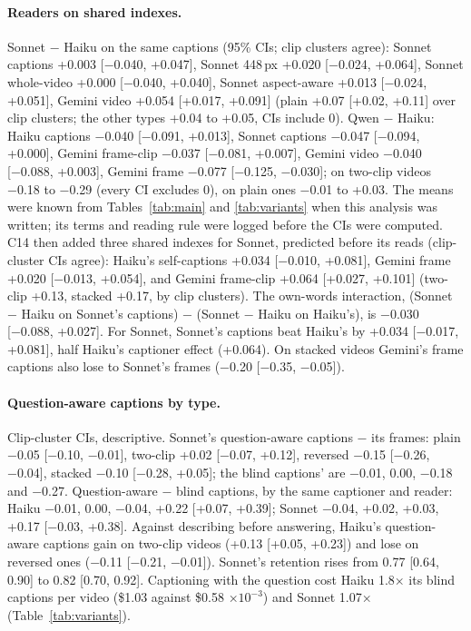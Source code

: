 \documentclass[11pt]{article}
\begin{document}
\paragraph{Readers on shared indexes.} Sonnet − Haiku on the same captions (95\% CIs; clip clusters agree): Sonnet captions +0.003 [−0.040, +0.047], Sonnet 448\,px +0.020 [−0.024, +0.064], Sonnet whole-video +0.000 [−0.040, +0.040], Sonnet aspect-aware +0.013 [−0.024, +0.051], Gemini video +0.054 [+0.017, +0.091] (plain +0.07 [+0.02, +0.11] over clip clusters; the other types +0.04 to +0.05, CIs include 0). Qwen − Haiku: Haiku captions −0.040 [−0.091, +0.013], Sonnet captions −0.047 [−0.094, +0.000], Gemini frame-clip −0.037 [−0.081, +0.007], Gemini video −0.040 [−0.088, +0.003], Gemini frame −0.077 [−0.125, −0.030]; on two-clip videos −0.18 to −0.29 (every CI excludes 0), on plain ones −0.01 to +0.03. The means were known from Tables~\ref{tab:main} and \ref{tab:variants} when this analysis was written; its terms and reading rule were logged before the CIs were computed. C14 then added three shared indexes for Sonnet, predicted before its reads (clip-cluster CIs agree): Haiku's self-captions +0.034 [−0.010, +0.081], Gemini frame +0.020 [−0.013, +0.054], and Gemini frame-clip +0.064 [+0.027, +0.101] (two-clip +0.13, stacked +0.17, by clip clusters). The own-words interaction, (Sonnet − Haiku on Sonnet's captions) − (Sonnet − Haiku on Haiku's), is −0.030 [−0.088, +0.027]. For Sonnet, Sonnet's captions beat Haiku's by +0.034 [−0.017, +0.081], half Haiku's captioner effect (+0.064). On stacked videos Gemini's frame captions also lose to Sonnet's frames (−0.20 [−0.35, −0.05]).

\paragraph{Question-aware captions by type.} Clip-cluster CIs, descriptive. Sonnet's question-aware captions − its frames: plain −0.05 [−0.10, −0.01], two-clip +0.02 [−0.07, +0.12], reversed −0.15 [−0.26, −0.04], stacked −0.10 [−0.28, +0.05]; the blind captions' are −0.01, 0.00, −0.18 and −0.27. Question-aware − blind captions, by the same captioner and reader: Haiku −0.01, 0.00, −0.04, +0.22 [+0.07, +0.39]; Sonnet −0.04, +0.02, +0.03, +0.17 [−0.03, +0.38]. Against describing before answering, Haiku's question-aware captions gain on two-clip videos (+0.13 [+0.05, +0.23]) and lose on reversed ones (−0.11 [−0.21, −0.01]). Sonnet's retention rises from 0.77 [0.64, 0.90] to 0.82 [0.70, 0.92]. Captioning with the question cost Haiku 1.8× its blind captions per video (\$1.03 against \$0.58 ×$10^{-3}$) and Sonnet 1.07× (Table~\ref{tab:variants}).
\end{document}
